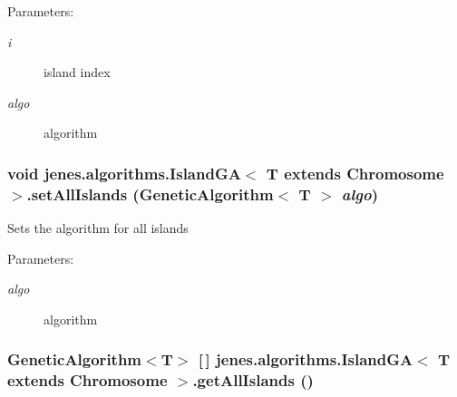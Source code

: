\begin{Desc}
\item[Parameters:]
\begin{description}
\item[{\em i}]island index \item[{\em algo}]algorithm \end{description}
\end{Desc}
\hypertarget{classjenes_1_1algorithms_1_1_island_g_a_3_01_t_01extends_01_chromosome_01_4_46c43be9c86897a05eb25db32c0935c1}{
\subsubsection[setAllIslands]{\setlength{\rightskip}{0pt plus 5cm}void jenes.algorithms.IslandGA$<$ T extends Chromosome $>$.setAllIslands (GeneticAlgorithm$<$ T $>$ {\em algo})}}
\label{classjenes_1_1algorithms_1_1_island_g_a_3_01_t_01extends_01_chromosome_01_4_46c43be9c86897a05eb25db32c0935c1}


Sets the algorithm for all islands

\begin{Desc}
\item[Parameters:]
\begin{description}
\item[{\em algo}]algorithm \end{description}
\end{Desc}
\hypertarget{classjenes_1_1algorithms_1_1_island_g_a_3_01_t_01extends_01_chromosome_01_4_adf9a8c907983a8ff03a6358b8270d82}{
\subsubsection[getAllIslands]{\setlength{\rightskip}{0pt plus 5cm}GeneticAlgorithm$<$T$>$ \mbox{[}$\,$\mbox{]} jenes.algorithms.IslandGA$<$ T extends Chromosome $>$.getAllIslands ()}}
\label{classjenes_1_1algorithms_1_1_island_g_a_3_01_t_01extends_01_chromosome_01_4_adf9a8c907983a8ff03a6358b8270d82}


